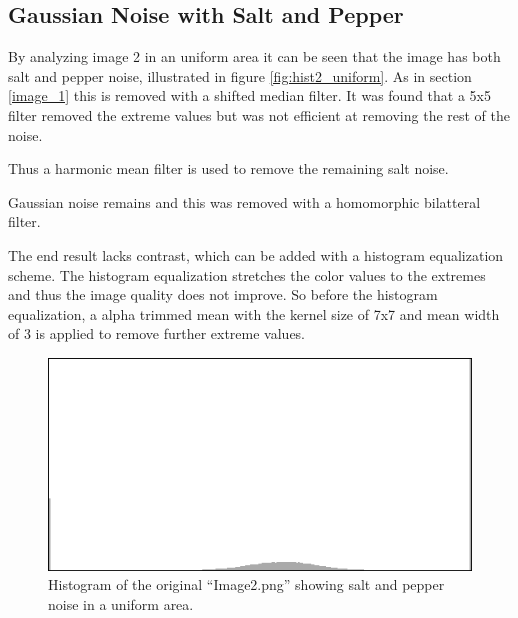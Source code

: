 \subsection{Gaussian Noise with Salt and Pepper}

By analyzing image 2 in an uniform area it can be seen that the image has both salt and pepper noise, illustrated in figure \ref{fig:hist2_uniform}.
As in section \ref{image_1} this is removed with a shifted median filter. 
It was found that a 5x5 filter removed the extreme values but was not efficient at removing the rest of the noise.

Thus a harmonic mean filter is used to remove the remaining salt noise.

Gaussian noise remains and this was removed with a homomorphic bilatteral filter.

The end result lacks contrast, which can be added with a histogram equalization scheme.
The histogram equalization stretches the color values to the extremes and thus the image quality does not improve.
So before the histogram equalization, a alpha trimmed mean with the kernel size of 7x7 and mean width of 3 is applied to remove further extreme values.

\begin{figure}[H]
\includegraphics[width = 0.8 \linewidth]{graphics/hist2_uniform.png}
\caption{Histogram of the original ``Image2.png'' showing salt and pepper noise in a uniform area.}
\label{fig:hist_pepper_im02}
\end{figure}
